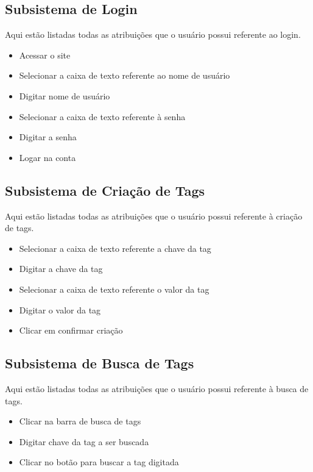     \subsection{Subsistema de Login}
        Aqui estão listadas todas as atribuições que o usuário possui referente ao login.
        \begin{itemize}
            \item Acessar o site
            \item Selecionar a caixa de texto referente ao nome de usuário
            \item Digitar nome de usuário
            \item Selecionar a caixa de texto referente à senha
            \item Digitar a senha
            \item Logar na conta
        \end{itemize}
    \subsection{Subsistema de Criação de Tags}
        Aqui estão listadas todas as atribuições que o usuário possui referente à criação de tags.
        \begin{itemize}
            \item Selecionar a caixa de texto referente a chave da tag
            \item Digitar a chave da tag
            \item Selecionar a caixa de texto referente o valor da tag
            \item Digitar o valor da tag
            \item Clicar em confirmar criação
        \end{itemize}
    \subsection{Subsistema de Busca de Tags}
        Aqui estão listadas todas as atribuições que o usuário possui referente à busca de tags.
        \begin{itemize}
            \item Clicar na barra de busca de tags
            \item Digitar chave da tag a ser buscada
            \item Clicar no botão para buscar a tag digitada
        \end{itemize}

